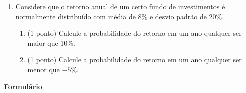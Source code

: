 \documentclass{article}
\begin{document}
\begin{enumerate}
\begin{enumerate}
	\item (1 ponto) Calcule a função de distribuição acumulada de $X$.
	
	\item (1 ponto) Calcule $P(X > 20)$.
\end{enumerate}

\item Considere que o retorno anual de um certo fundo de investimentos é normalmente distribuído com média de 8\% e desvio padrão de 20\%.
\begin{enumerate}
  	\item (1 ponto) Calcule a probabilidade do retorno em um ano qualquer ser maior que 10\%.
   	\item (1 ponto) Calcule a probabilidade do retorno em um ano qualquer ser menor que $-5$\%.
\end{enumerate} 


\end{enumerate}



\vspace{1cm}

\begin{center}
	\Large{\textbf{Formulário}}
\end{center}
\end{document}
